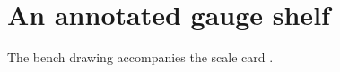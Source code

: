 \documentclass{article}
\begin{document}
\section*{An annotated gauge shelf}
The bench drawing \autocite{bench} accompanies the scale card \autocite{scale}.\printbibliography
\end{document}
